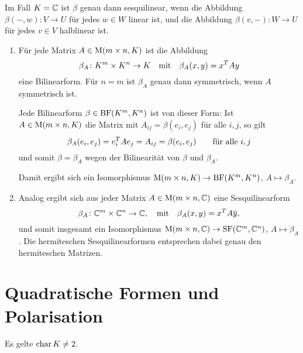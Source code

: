 Im Fall $K = \mathbb{C}$ ist $\beta$ genau dann sesquilinear, wenn die Abbildung $\beta(-,w) \colon V \to U$ für jedes $w \in W$ linear ist, und die Abbildung $\beta(v,-) \colon W \to U$ für jedes $v \in V$ halblinear ist.

\begin{example}
  \leavevmode
  \begin{enumerate}
    \item
      Für jede Matrix $A \in \operatorname{M}(m \times n, K)$ ist die Abbildung
      \[
                \beta_A
        \colon  K^m \times K^n
        \to     K
        \quad\text{mit}\quad
          \beta_A(x,y)
        = x^T A y
      \]
      eine Bilinearform.
      Für $n = m$ ist $\beta_A$ genau dann symmetrisch, wenn $A$ symmetrisch ist.
      
      Jede Bilinearform $\beta \in \operatorname{BF}(K^m, K^n)$ ist von dieser Form:
      Ist $A \in \operatorname{M}(m \times n, K)$ die Matrix mit $A_{ij} = \beta(e_i, e_j)$ für alle $i, j$, so gilt
      \[
          \beta_A(e_i, e_j)
        = e_i^T A e_j
        = A_{ij}
        = \beta(e_i, e_j)
        \qquad
        \text{für alle $i, j$}
      \]
      und somit $\beta = \beta_A$ wegen der Bilinearität von $\beta$ und $\beta_A$.
      
      Damit ergibt sich ein Isomorphismus $\operatorname{M}(m \times n, K) \to \operatorname{BF}(K^m, K^n)$, $A \mapsto \beta_A$.
      
    \item
      Analog ergibt sich aus jeder Matrix $A \in \operatorname{M}(m \times n, \mathbb{C})$ eine Sesquilinearform
      \[
                \beta_A
        \colon  \mathbb{C}^m \times \mathbb{C}^n
        \to     \mathbb{C},
        \quad\text{mit}\quad
          \beta_A(x,y)
        = x^T A \overline{y},
      \]
      und somit insgesamt ein Isomorphismus $\operatorname{M}(m \times n, \mathbb{C}) \to \operatorname{SF}(\mathbb{C}^m, \mathbb{C}^n)$, $A \mapsto \beta_A$.
      Die hermiteschen Sesquilinearformen entsprechen dabei genau den hermiteschen Matrizen.
  \end{enumerate}
\end{example}





\section{Quadratische Formen und Polarisation}
\label{section: quadratic forms and polarisation}

Es gelte $\operatorname{char} K \neq 2$.

